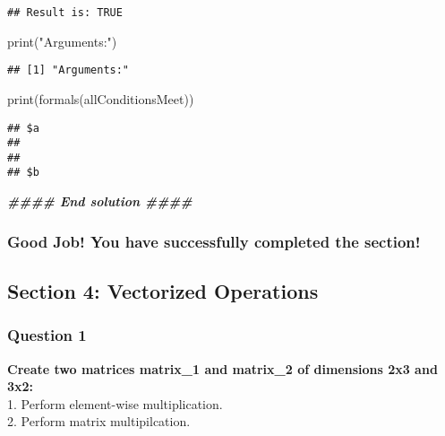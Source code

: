 \documentclass[
]{article}
\newenvironment{Shaded}{\begin{snugshade}}{\end{snugshade}}
\newcommand{\DocumentationTok}[1]{\textcolor[rgb]{0.56,0.35,0.01}{\textbf{\textit{#1}}}}
\newcommand{\FunctionTok}[1]{\textcolor[rgb]{0.00,0.00,0.00}{#1}}
\newcommand{\NormalTok}[1]{#1}
\newcommand{\StringTok}[1]{\textcolor[rgb]{0.31,0.60,0.02}{#1}}
\begin{document}
\begin{verbatim}
## Result is: TRUE
\end{verbatim}

\begin{Shaded}
\begin{Highlighting}[]
\FunctionTok{print}\NormalTok{(}\StringTok{"Arguments:"}\NormalTok{)}
\end{Highlighting}
\end{Shaded}

\begin{verbatim}
## [1] "Arguments:"
\end{verbatim}

\begin{Shaded}
\begin{Highlighting}[]
\FunctionTok{print}\NormalTok{(}\FunctionTok{formals}\NormalTok{(allConditionsMeet))}
\end{Highlighting}
\end{Shaded}

\begin{verbatim}
## $a
## 
## 
## $b
\end{verbatim}

\begin{Shaded}
\begin{Highlighting}[]
\DocumentationTok{\#\#\#\# End solution \#\#\#\#}
\end{Highlighting}
\end{Shaded}

\hypertarget{good-job-you-have-successfully-completed-the-section-2}{%
\subsubsection{Good Job! You have successfully completed the
section!}\label{good-job-you-have-successfully-completed-the-section-2}}

\hypertarget{section-4-vectorized-operations}{%
\subsection{Section 4: Vectorized
Operations}\label{section-4-vectorized-operations}}

\hypertarget{question-1-3}{%
\subsubsection{Question 1}\label{question-1-3}}

\textbf{Create two matrices matrix\_1 and matrix\_2 of dimensions 2x3
and 3x2:}\\
1. Perform element-wise multiplication.\\
2. Perform matrix multipilcation.
\end{document}
